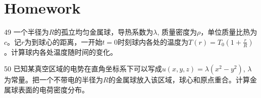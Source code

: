 \documentclass[CJK]{beamer}
\begin{document}
\section{Homework}

\begin{frame}
\bch
\bitem
\item[49]{一个半径为$R$的孤立均匀金属球，导热系数为$\lambda$, 质量密度为$\rho$，单位质量比热为$c$。记$r$为到球心的距离，一开始$t=0$时刻球内各处的温度为$T(r) = T_0\left(1+\frac{r}{R}\right)$。计算球内各处温度随时间的变化。}
\item[50]{已知某真空区域的电势在直角坐标系下可以写成$ u(x,y,z) = \lambda(x^2-y^2)$, $\lambda$为常量。把一个不带电的半径为$R$的金属球放入该区域，球心和原点重合。计算金属球表面的电荷密度分布。}
  
  \eitem
\ech
\end{frame}
\end{document}
